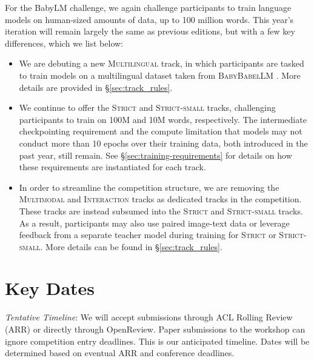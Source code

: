 \documentclass[11pt]{article}
\newcommand{\strict}[1]{\textsc{Strict}}
\newcommand{\strictsmall}[1]{\textsc{Strict-small}}
\newcommand{\vision}[1]{\textsc{Multimodal}}
\newcommand{\interact}[1]{\textsc{Interaction}}
\newcommand{\multilingual}[1]{\textsc{Multilingual}}
\begin{document}
For the BabyLM challenge, we again challenge participants to train language models on human-sized amounts of data, up to 100 million words. %
This year's iteration will remain largely the same as previous editions, but with a few key differences, which we list below:
\begin{itemize}[leftmargin=0.5cm,rightmargin=0.5cm]
    \item We are debuting a new \multilingual{} track, in which participants are tasked to train models on a multilingual dataset taken from \textsc{BabyBabelLM} \citep{DBLP:journals/corr/abs-2510-10159}. More details are provided in \S\ref{sec:track_rules}.
    \item We continue to offer the \strict{} and \strictsmall{} tracks, challenging participants to train on 100M and 10M words, respectively. The intermediate checkpointing requirement and the compute limitation that models may not conduct more than 10 epochs over their training data, both introduced in the past year, still remain. See \S\ref{sec:training-requirements} for details on how these requirements are instantiated for each track.
    \item In order to streamline the competition structure, we are removing the \vision{} and \interact{} tracks as dedicated tracks in the competition. These tracks are instead subsumed into the \strict{} and \strictsmall{} tracks. As a result, participants may also use paired image-text data or leverage feedback from a separate teacher model during training for \strict{} or \strictsmall{}. More details can be found in \S\ref{sec:track_rules}.
\end{itemize}

\section{Key Dates} %

\emph{Tentative Timeline}: We will accept submissions through ACL Rolling Review (ARR) or directly through OpenReview. Paper submissions to the workshop can ignore competition entry deadlines. This is our anticipated timeline. Dates will be determined based on eventual ARR and conference deadlines.
\end{document}
